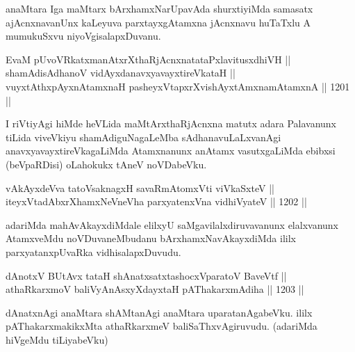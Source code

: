 \begin{artha}
anaMtara Iga maMtarx bArxhamxNarUpavAda shurxtiyiMda samasatx ajAcnxnavanUnx kaLeyuva parxtayxgAtamxna jAcnxnavu huTaTxlu A mumukuSxvu niyoVgisalapxDuvanu.
\end{artha}


\begin{shl}
EvaM pUvoVRkatxmanAtxrXthaRjAcnxnatataPxlavitusxdhiVH || \\
shamAdisAdhanoV vidAyxdanavxyavayxtireVkataH || \\
vuyxtAthxpAyxnAtamxnaH pasheyxVtapxrXvishAyx\s \s tAmxnamAtamxnA \hfill || 1201 || 
\end{shl} 

\begin{artha}
I riVtiyAgi hiMde heVLida maMtArxthaRjAcnxna matutx adara Palavanunx tiLida viveVkiyu shamAdiguNagaLeMba sAdhanavuLaLxvanAgi anavxyavayxtireVkagaLiMda Atamxnanunx anAtamx vasutxgaLiMda ebibxsi (beVpaRDisi) oLahokukx tAneV noVDabeVku.
\end{artha}

\begin{shl}
vAkAyxdeVva tatoV\s saknagxH savaRmAtomxVti viVkaSxteV || \\
iteyxVtadAbxrXhamxNeVneVha parxyatenxVna vidhiVyateV \hfill || 1202 ||  
\end{shl}

\begin{artha}
adariMda mahAvAkayxdiMdale elilxyU saMgavilalxdiruvavanunx elalxvanunx AtamxveMdu noVDuvaneMbudanu bArxhamxNavAkayxdiMda ililx parxyatanxpUvaRka vidhisalapxDuvudu.
\end{artha}

\begin{shl}
dAnotxV BUtAvx tataH shAnatxsatxtashocxVparatoV BaveVtf ||  \\
athaRkarxmoV baliVyAnAsxyXdayxtaH pAThakarxmAdiha \hfill || 1203 ||  
\end{shl}


\begin{artha}
dAnatxnAgi anaMtara shAMtanAgi anaMtara uparatanAgabeVku. ililx pAThakarxmakikxMta athaRkarxmeV baliSaThxvAgiruvudu. (adariMda hiVgeMdu tiLiyabeVku)
\end{artha}


